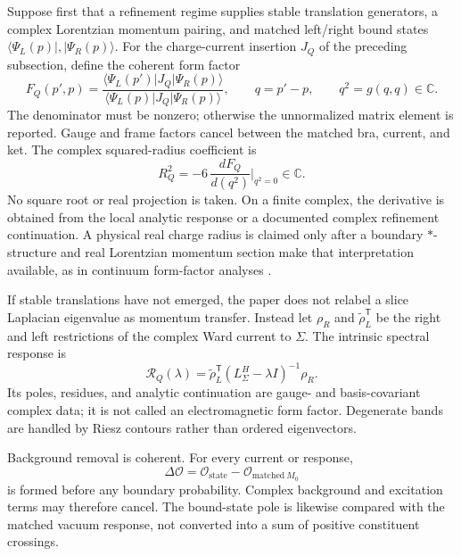 \documentclass[11pt,letterpaper]{article}
\begin{document}
Suppose first that a refinement regime supplies stable translation generators,
a complex Lorentzian momentum pairing, and matched left/right bound states
$\langle\Psi_L(p)\rvert,\lvert\Psi_R(p)\rangle$. For the charge-current
insertion $J_Q$ of the preceding subsection, define the coherent form factor
\begin{equation*}
  F_Q(p',p)=
  \frac{\langle\Psi_L(p')\rvert J_Q\lvert\Psi_R(p)\rangle}
       {\langle\Psi_L(p)\rvert J_Q\lvert\Psi_R(p)\rangle},
  \qquad q=p'-p,\qquad q^2=g(q,q)\in\mathbb C .
\end{equation*}
The denominator must be nonzero; otherwise the unnormalized matrix element is
reported. Gauge and frame factors cancel between the matched bra, current, and
ket. The complex squared-radius coefficient is
\begin{equation*}
  R_Q^2=-6\,\frac{dF_Q}{d(q^2)}\bigg|_{q^2=0}\in\mathbb C .
\end{equation*}
No square root or real projection is taken. On a finite complex, the derivative
is obtained from the local analytic response or a documented complex
refinement continuation. A physical real charge radius is claimed only after a
boundary $*$-structure and real Lorentzian momentum section make that
interpretation available, as in continuum form-factor analyses
\cite{gramolinrussell2022}.

If stable translations have not emerged, the paper does not relabel a slice
Laplacian eigenvalue as momentum transfer. Instead let $\rho_R$ and
$\widetilde\rho_L^{\mathsf T}$ be the right and left restrictions of the
complex Ward current to $\Sigma$. The intrinsic spectral response is
\begin{equation*}
  \mathcal R_Q(\lambda)=
  \widetilde\rho_L^{\mathsf T}
  (L_\Sigma^H-\lambda I)^{-1}\rho_R .
\end{equation*}
Its poles, residues, and analytic continuation are gauge- and basis-covariant
complex data; it is not called an electromagnetic form factor. Degenerate
bands are handled by Riesz contours rather than ordered eigenvectors.

Background removal is coherent. For every current or response,
\begin{equation*}
  \Delta\mathcal O=\mathcal O_{\mathrm{state}}
                    -\mathcal O_{\mathrm{matched\ }M_0}
\end{equation*}
is formed before any boundary probability. Complex background and excitation
terms may therefore cancel. The bound-state pole is likewise compared with the
matched vacuum response, not converted into a sum of positive constituent
crossings.
\end{document}
